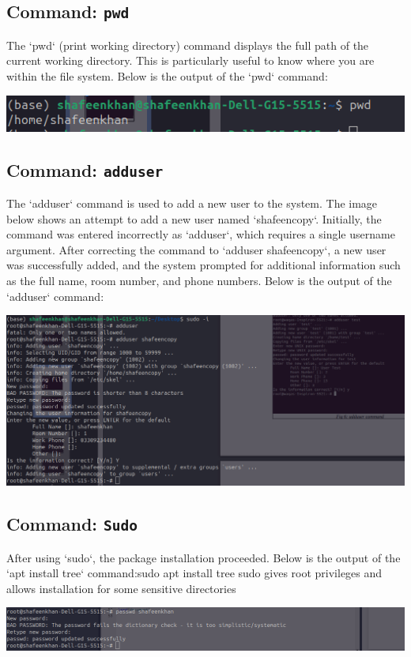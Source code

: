 \documentclass{article}
\begin{document}
\subsection{Command: \texttt{pwd}}
The `pwd` (print working directory) command displays the full path of the current working directory. This is particularly useful to know where you are within the file system. Below is the output of the `pwd` command:
\begin{center}
    \includegraphics[width=0.8\linewidth]{4.png}
\end{center}



\subsection{Command: \texttt{adduser}}
The `adduser` command is used to add a new user to the system. The image below shows an attempt to add a new user named `shafeencopy`. Initially, the command was entered incorrectly as `adduser`, which requires a single username argument. After correcting the command to `adduser shafeencopy`, a new user was successfully added, and the system prompted for additional information such as the full name, room number, and phone numbers. Below is the output of the `adduser` command:
\begin{center}
    \includegraphics[width=0.8\linewidth]{5.png}
\end{center}

\subsection{Command: \texttt{Sudo}}
After using `sudo`, the package installation proceeded. Below is the output of the `apt install tree` command:sudo apt install tree 
sudo gives root privileges and allows installation for some sensitive directories
\begin{center}
    \includegraphics[width=0.8\linewidth]{6.png}
\end{center}
\end{document}
